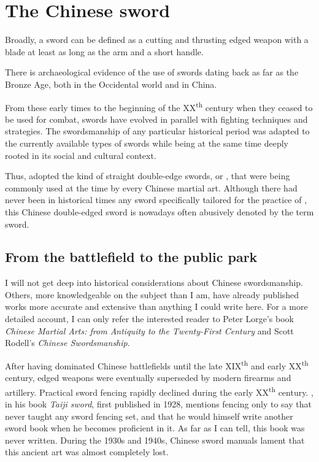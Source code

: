 \chapter{The Chinese sword}\label{ch:chinesesword}

Broadly, a sword can be defined as a cutting and thrusting edged weapon with a blade at least as long as the arm and a short handle.

There is archaeological evidence of the use of swords dating back as far as the Bronze Age, both in the Occidental world and in China.

From these early times to the beginning of the XX\textsuperscript{th} century when they ceased to be used for combat, swords have evolved in parallel with fighting techniques and strategies.
The swordsmanship of any particular historical period was adapted to the currently available types of swords while being at the same time deeply rooted in its social and cultural context.

Thus, \Taijijian{} adopted the kind of straight double-edge swords, or \Jian{}, that were being commonly used at the time by every Chinese martial art.
Although there had never been in historical times any sword specifically tailored for the practice of \Taijijian{}, this Chinese double-edged sword is nowadays often abusively denoted by the term \Taiji{} sword.

\section{From the battlefield to the public park}
I will not get deep into historical considerations about Chinese swordsmanship. Others, more knowledgeable on the subject than I am, have already published works more accurate and extensive than anything I could write here.
For a more detailed account, I can only refer the interested reader to Peter Lorge's book \textit{Chinese Martial Arts: from Antiquity to the Twenty-First Century} and Scott Rodell's \textit{Chinese Swordsmanship}.

After having dominated Chinese battlefields until the late XIX\textsuperscript{th} and early XX\textsuperscript{th} century, edged weapons were eventually superseded by modern firearms and artillery. Practical sword fencing rapidly declined during the early XX\textsuperscript{th} century.
\ChenWeiming{}, in his book \textit{Taiji sword}, first published in 1928, mentions fencing only to say that \YangChengfu{} never taught any sword fencing set, and that he would himself write another sword book when he becomes proficient in it. As far as I can tell, this book was never written.
During the 1930s and 1940s, Chinese sword manuals lament that this ancient art was almost completely lost. 


